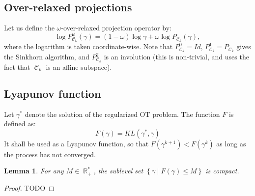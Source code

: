 \documentclass{article} %
\DeclareMathOperator{\IR}{\mathbb{R}}
\DeclareMathOperator{\Ccal}{\mathcal{C}}
\theoremstyle{plain}
\newtheorem{lemma}{Lemma}
\theoremstyle{definition}
\theoremstyle{remark}
\begin{document}
\subsection{Over-relaxed projections}

Let us define the $\omega$-over-relaxed projection operator by:
\begin{equation}\label{eq:def_or_proj}
\log P^\omega_{\Ccal_k}(\gamma) = (1-\omega) \log \gamma + \omega \log P_{\Ccal_k}(\gamma),
\end{equation}
where the logarithm is taken coordinate-wise.
Note that $P_{\Ccal_k}^0 = Id$, $P_{\Ccal_k}^1 = P_{\Ccal_k}$ gives the Sinkhorn algorithm, and $P_{\Ccal_k}^2$ is an involution (this is non-trivial, and uses the fact that $\Ccal_k$ is an affine subspace).

\subsection{Lyapunov function}
Let $\gamma^*$ denote the solution of the regularized OT problem.
The function $F$ is defined as:
\begin{equation}\label{eq:lyapunov_function}
F(\gamma) = KL(\gamma^*, \gamma)
\end{equation}
It shall be used as a Lyapunov function, so that $F(\gamma^{k+1}) < F(\gamma^k)$ as long as the process has not converged.


\begin{lemma} \label{lemma:KL_compact}
	For any $M \in \IR_+^*$, the sublevel set $\left\{ \gamma \mid F(\gamma) \le M \right\}$ is compact.
\end{lemma}
\begin{proof}
	{\color{red} TODO}
\end{proof}
\end{document}
